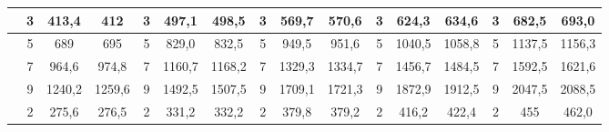 \documentclass[a4paper]{article}
\begin{document}
\begin{table}[!h]
\begin{tabular}{|c|ccc|ccc|ccc|ccc|ccc|}
                                                             & \multicolumn{1}{c|}{3}  & \multicolumn{1}{c|}{413,4}         & 412              & \multicolumn{1}{c|}{3}  & \multicolumn{1}{c|}{497,1}         & 498,5              & \multicolumn{1}{c|}{3}  & \multicolumn{1}{c|}{569,7}         & 570,6              & \multicolumn{1}{c|}{3}  & \multicolumn{1}{c|}{624,3}         & 634,6              & \multicolumn{1}{c|}{3}  & \multicolumn{1}{c|}{682,5}         & 693,0              \\ \hline
                                                             & \multicolumn{1}{c|}{5}  & \multicolumn{1}{c|}{689}           & 695              & \multicolumn{1}{c|}{5}  & \multicolumn{1}{c|}{829,0}         & 832,5              & \multicolumn{1}{c|}{5}  & \multicolumn{1}{c|}{949,5}         & 951,6              & \multicolumn{1}{c|}{5}  & \multicolumn{1}{c|}{1040,5}        & 1058,8             & \multicolumn{1}{c|}{5}  & \multicolumn{1}{c|}{1137,5}        & 1156,3             \\ \hline
                                                             & \multicolumn{1}{c|}{7}  & \multicolumn{1}{c|}{964,6}         & 974,8              & \multicolumn{1}{c|}{7}  & \multicolumn{1}{c|}{1160,7}        & 1168,2             & \multicolumn{1}{c|}{7}  & \multicolumn{1}{c|}{1329,3}        & 1334,7             & \multicolumn{1}{c|}{7}  & \multicolumn{1}{c|}{1456,7}        & 1484,5             & \multicolumn{1}{c|}{7}  & \multicolumn{1}{c|}{1592,5}        & 1621,6             \\ \hline
                                                             & \multicolumn{1}{c|}{9}  & \multicolumn{1}{c|}{1240,2}        & 1259,6            & \multicolumn{1}{c|}{9}  & \multicolumn{1}{c|}{1492,5}        & 1507,5             & \multicolumn{1}{c|}{9}  & \multicolumn{1}{c|}{1709,1}        & 1721,3             & \multicolumn{1}{c|}{9}  & \multicolumn{1}{c|}{1872,9}        & 1912,5             & \multicolumn{1}{c|}{9}  & \multicolumn{1}{c|}{2047,5}        & 2088,5             \\ \hline
                                                             & \multicolumn{1}{c|}{2}  & \multicolumn{1}{c|}{275,6}         & 276,5              & \multicolumn{1}{c|}{2}  & \multicolumn{1}{c|}{331,2}         & 332,2              & \multicolumn{1}{c|}{2}  & \multicolumn{1}{c|}{379,8}         & 379,2              & \multicolumn{1}{c|}{2}  & \multicolumn{1}{c|}{416,2}         & 422,4              & \multicolumn{1}{c|}{2}  & \multicolumn{1}{c|}{455}           & 462,0              \\ \hline

\end{tabular}
\end{table}
\end{document}
